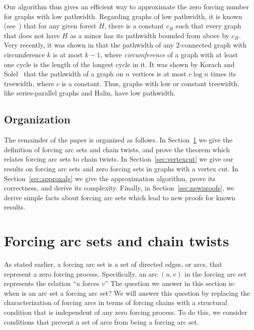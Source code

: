 \documentclass[12pt]{amsart}
\theoremstyle{plain}
\theoremstyle{definition}
\begin{document}
Our algorithm thus gives an efficient way to approximate the zero forcing number for graphs with low pathwidth.
Regarding graphs of low pathwidth, it is known (see~\cite{Bodlaender2012}) that for any given forest $H$, there is a constant $c_H$ such that every graph that does not have $H$ as a minor has its pathwidth bounded from above by $c_H$. Very recently, it was shown in \cite{BrianskiJMMSS23} that the pathwidth of any $2$-connected graph with circumference $k$ is at most $k-1$, where \emph{circumference} of a graph with at least one cycle is the length of the longest cycle in it. It was shown by Korach and Solel~\cite{KORACH_pw} that the pathwidth of a graph on $n$ vertices is at most $c\log n$ times its treewidth, where $c$ is a constant. Thus, graphs with low or constant treewidth, like series-parallel graphs and Halin, have low pathwidth.  



\subsection{Organization}

The remainder of the paper is organized as follows. In Section~\ref{sec:chaintwists} we 
give the definition of forcing arc sets and chain twists, and prove the theorem which relates forcing arc sets to chain twists.
In Section~\ref{sec:vertexcut} we give our results on forcing arc sets and zero forcing sets in graphs with a vertex cut. 
In Section~\ref{sec:approxalg} we give the approximation algorithm, prove its correctness, and derive its complexity. 
Finally, in Section~\ref{sec:newproofs}, we derive simple facts about forcing arc sets which lead to new proofs for known results.

\section{Forcing arc sets and chain twists}\label{sec:chaintwists}

As stated earlier, a forcing arc set is a set of directed edges, or arcs, that represent a zero forcing process. Specifically, an arc $(u,v)$ in the forcing arc set represents the relation ``$u$ forces $v$'' 
The question we answer in this section is: when is an arc set a forcing arc set? We will answer this question by replacing the characterization of forcing arcs in terms of forcing chains with a structural condition that is independent of any zero forcing process. To do this, we consider conditions that prevent a set of arcs from being a forcing arc set. 
\end{document}

